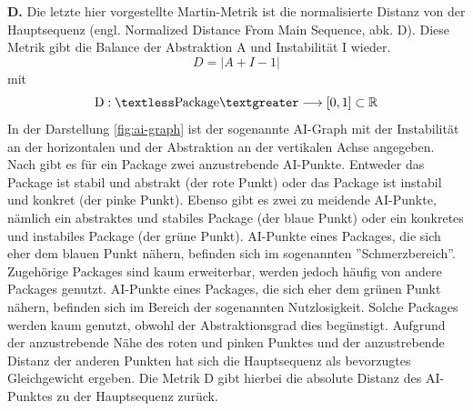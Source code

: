 \documentclass[12pt]{article}
\begin{document}
\textbf{D.}\label{D} Die letzte hier vorgestellte Martin-Metrik
ist die normalisierte Distanz von der Hauptsequenz (engl.
Normalized Distance From Main Sequence, abk. D). Diese Metrik
gibt die Balance der Abstraktion A und Instabilität I wieder.
\[
        D = |A + I - 1|
\]
mit 
\[
        \text{D}: \textless \text{Package} \textgreater
        \longrightarrow [0,1] \subset \mathbb{R}
\]
In der Darstellung \ref{fig:ai-graph} ist der sogenannte AI-Graph
mit der Instabilität an der horizontalen und der Abstraktion an
der vertikalen Achse angegeben.  Nach \cite{Mar94} gibt es für
ein Package zwei anzustrebende AI-Punkte. Entweder das Package
ist stabil und abstrakt (der rote Punkt) oder das Package ist
instabil und konkret (der pinke Punkt). Ebenso gibt es zwei zu
meidende AI-Punkte, nämlich ein abstraktes und stabiles Package
(der blaue Punkt) oder ein konkretes und instabiles Package (der
grüne Punkt). AI-Punkte eines Packages, die sich eher dem blauen
Punkt nähern, befinden sich im sogenannten ''Schmerzbereich''.
Zugehörige Packages sind kaum erweiterbar, werden jedoch häufig
von andere Packages genutzt. AI-Punkte eines Packages, die sich
eher dem grünen Punkt nähern, befinden sich im Bereich der
sogenannten Nutzlosigkeit.  Solche Packages werden kaum genutzt,
obwohl der Abstraktionsgrad dies begünstigt. Aufgrund der
anzustrebende Nähe des roten und pinken Punktes und der
anzustrebende Distanz der anderen Punkten hat sich die
Hauptsequenz als bevorzugtes Gleichgewicht ergeben.  Die Metrik D
gibt hierbei die absolute Distanz des AI-Punktes zu der
Hauptsequenz zurück.

\end{document}
